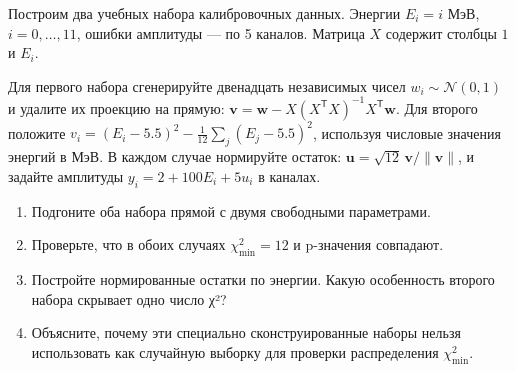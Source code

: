 \documentclass[
  russian,
  11pt,
  a4paper,
  open=any]{scrbook}
\providecommand{\tightlist}{%
  \setlength{\itemsep}{0pt}\setlength{\parskip}{0pt}}
\begin{document}
\begin{semanticpdfbox}[colback=BookCoralSoft,borderline west={1.2mm}{0pt}{BookCoral}]

\par\nopagebreak[4]\vspace{1.2mm}

Построим два учебных набора калибровочных данных. Энергии \(E_i=i\) МэВ,
\(i=0,\ldots,11\), ошибки амплитуды --- по 5 каналов. Матрица \(X\)
содержит столбцы \(1\) и \(E_i\).

Для первого набора сгенерируйте двенадцать независимых чисел
\(w_i\sim\mathcal N(0,1)\) и удалите их проекцию на прямую:
\(\mathbf v=\mathbf w-X(X^{\mathsf T}X)^{-1}X^{\mathsf T}\mathbf w\).
Для второго положите \(v_i=(E_i-5.5)^2-\tfrac1{12}\sum_j(E_j-5.5)^2\),
используя числовые значения энергий в МэВ. В каждом случае нормируйте
остаток: \(\mathbf u=\sqrt{12}\,\mathbf v/\|\mathbf v\|\), и задайте
амплитуды \(y_i=2+100E_i+5u_i\) в каналах.

\begin{enumerate}
\def\labelenumi{\arabic{enumi}.}
\tightlist
\item
  Подгоните оба набора прямой с двумя свободными параметрами.
\item
  Проверьте, что в обоих случаях \(\chi^2_{\min}=12\) и p-значения
  совпадают.
\item
  Постройте нормированные остатки по энергии. Какую особенность второго
  набора скрывает одно число χ²?
\item
  Объясните, почему эти специально сконструированные наборы нельзя
  использовать как случайную выборку для проверки распределения
  \(\chi^2_{\min}\).
\end{enumerate}

\end{semanticpdfbox}
\end{document}
